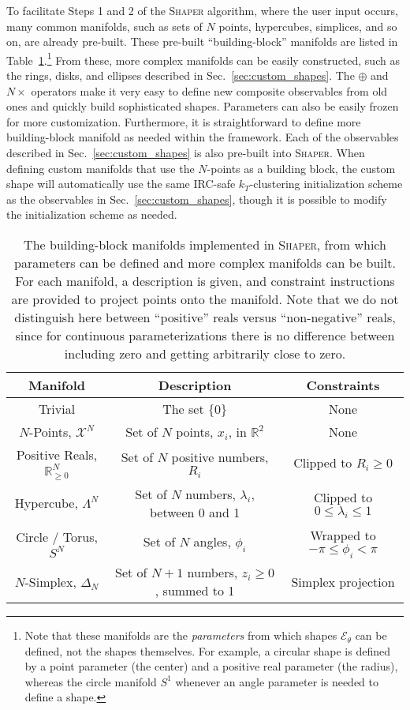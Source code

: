 \documentclass[letterpaper,11pt]{article}
\newcommand{\E}{\mathcal{E}}
\DeclareRobustCommand{\Sec}[1]{Sec.~\ref{sec:#1}}
\DeclareRobustCommand{\Tab}[1]{Table~\ref{tab:#1}}
\newcommand{\Shaper}{\textsc{Shaper}\xspace}
\begin{document}
To facilitate Steps 1 and 2 of the \Shaper algorithm, where the user input occurs, many common manifolds, such as sets of $N$ points, hypercubes, simplices, and so on, are already pre-built. These pre-built ``building-block'' manifolds are listed in \Tab{manifolds}.\footnote{Note that these manifolds are the \emph{parameters} from which shapes $\E_{\theta}$ can be defined, not the shapes themselves. For example, a circular shape is defined by a point parameter (the center) and a positive real parameter (the radius), whereas the circle manifold $S^1$ whenever an angle parameter is needed to define a shape.} From these, more complex manifolds can be easily constructed, such as the rings, disks, and ellipses described in \Sec{custom_shapes}. The $\oplus$ and $N\times$ operators make it very easy to define new composite observables from old ones and quickly build sophisticated shapes. Parameters can also be easily frozen for more customization. Furthermore, it is straightforward to define more building-block manifold as needed within the framework. Each of the observables described in \Sec{custom_shapes} is also pre-built into \Shaper. When defining custom manifolds that use the $N$-points as a building block, the custom shape will automatically use the same IRC-safe $k_T$-clustering initialization scheme as the observables in \Sec{custom_shapes}, though it is possible  to modify the initialization scheme as needed.



\begin{table}[tp]
\centering
\begin{tabular}{|c|c|c|}
\hline\hline
\bf Manifold & \bf Description  &  \bf Constraints  \\
\hline\hline
  Trivial & The set $\{0\}$ & None \\
  $N$-Points, $\mathcal{X}^N$ & Set of $N$ points, $x_i$, in $\mathbb{R}^2$ & None \\
  Positive Reals, $\mathbb{R}^N_{\geq 0}$ & Set of $N$ positive numbers, $R_i$ & Clipped to $R_i \geq 0$ \\
  Hypercube, $\Lambda^N$ & Set of $N$ numbers, $\lambda_i$, between 0 and 1 & Clipped to $0 \leq \lambda_i \leq 1$ \\
  Circle / Torus, $S^N$ & Set of $N$ angles, $\phi_i$ & Wrapped to $-\pi \leq \phi_i < \pi$ \\
  $N$-Simplex, $\Delta_N$ & Set of $N+1$ numbers, $z_i \geq 0$, summed to 1 & Simplex projection\\
\hline\hline
\end{tabular}
\caption{\label{tab:manifolds}
The building-block manifolds implemented in \Shaper, from which parameters can be defined and more complex manifolds can be built. For each manifold, a description is given, and constraint instructions are provided to project points onto the manifold.
Note that we do not distinguish here between ``positive'' reals versus ``non-negative'' reals, since for continuous parameterizations there is no difference between including zero and getting arbitrarily close to zero.}
\end{table}
\end{document}
